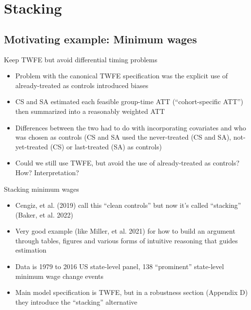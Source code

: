 \documentclass{beamer}
\begin{document}



\section{Stacking}

\subsection{Motivating example: Minimum wages}


\begin{frame}{Keep TWFE but avoid differential timing problems}

\begin{itemize}
\item Problem with the canonical TWFE specification was the explicit use of already-treated as controls introduced biases
\item CS and SA estimated each feasible group-time ATT (``cohort-specific ATT'') then summarized into a reasonably weighted ATT
\item Differences between the two had to do with incorporating covariates and who was chosen as controls (CS and SA used the never-treated (CS and SA), not-yet-treated (CS) or last-treated (SA) as controls)
\item Could we still use TWFE, but avoid the use of already-treated as controls?  How? Interpretation?
\end{itemize}

\end{frame}


\begin{frame}{Stacking minimum wages}

\begin{itemize}
\item  Cengiz, et al. (2019) call this ``clean controls'' but now it's called ``stacking'' (Baker, et al. 2022)
\item Very good example (like Miller, et al. 2021) for how to build an argument through tables, figures and various forms of intuitive reasoning that guides estimation
\item Data is 1979 to 2016 US state-level panel, 138 ``prominent'' state-level minimum wage change events
\item Main model specification is TWFE, but in a robustness section (Appendix D) they introduce the ``stacking'' alternative
\end{itemize}

\end{frame}
\end{document}
